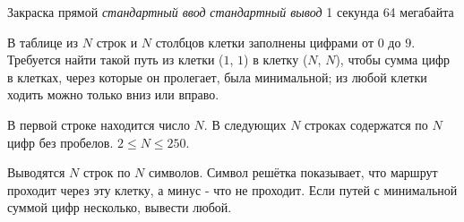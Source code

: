 \begin{problem}%
{Закраска прямой}%
{\textsl{стандартный ввод}}%
{\textsl{стандартный вывод}}%
{1 секунда}%
{64 мегабайта}%
{}

В таблице из $N$ строк и $N$ столбцов клетки заполнены цифрами от $0$ до $9$. Требуется найти такой путь из клетки ($1$, $1$) в клетку ($N$, $N$), чтобы сумма цифр в клетках, через которые он пролегает, была минимальной; из любой клетки ходить можно только вниз или вправо.

\InputFile

В первой строке находится число $N$. В следующих $N$ строках содержатся по $N$ цифр без пробелов. $2 \le N \le 250$.

\OutputFile

Выводятся $N$ строк по $N$ символов. Символ решётка показывает, что маршрут проходит через эту клетку, а минус - что не проходит. Если путей с минимальной суммой цифр несколько, вывести любой.

\Examples

\begin{example}
%
%
\end{example}
\end{problem}
